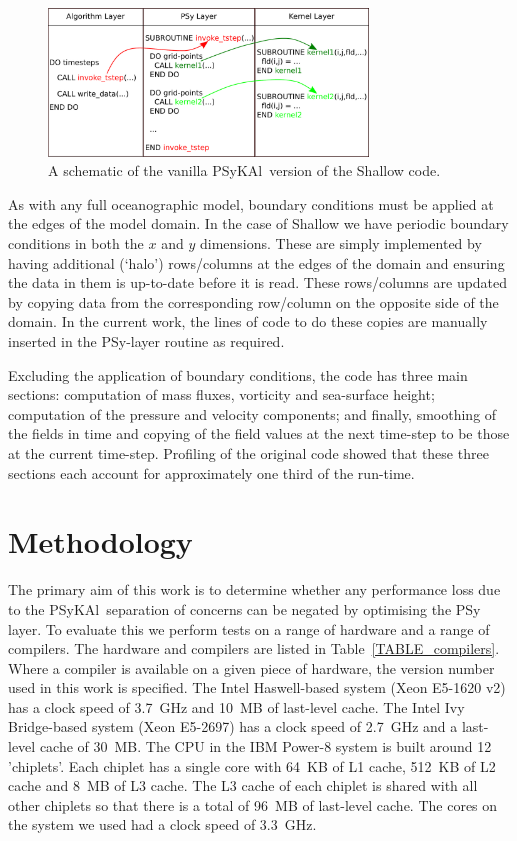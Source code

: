 \documentclass{IOS-Book-Article}
\newcommand{\psykal}{{PS}y{KA}l\ }
\begin{document}
\begin{figure}
\centering
\includegraphics[width=85mm]{psykal_shallow}
\caption{A schematic of the vanilla \psykal version of the Shallow code.}
\label{FIG_psykal_shallow_structure}
\end{figure}

As with any full oceanographic model, boundary conditions must be
applied at the edges of the model domain. In the case of Shallow we
have periodic boundary conditions in both the $x$ and $y$ dimensions.
These are simply implemented by having additional (`halo')
rows/columns at the edges of the domain and ensuring the data in them
is up-to-date before it is read. These rows/columns are updated by
copying data from the corresponding row/column on the opposite side of
the domain. In the current work, the lines of code to do these copies
are manually inserted in the PSy-layer routine as required.

Excluding the application of boundary conditions, the code has three
main sections: computation of mass fluxes, vorticity and sea-surface
height; computation of the pressure and velocity components; and
finally, smoothing of the fields in time and copying of the field
values at the next time-step to be those at the current
time-step. Profiling of the original code showed that these three
sections each account for approximately one third of the run-time.

\section{Methodology}

The primary aim of this work is to determine whether any performance
loss due to the \psykal separation of concerns can be negated by
optimising the PSy layer. To evaluate this we perform tests on a range
of hardware and a range of compilers. The hardware and compilers are
listed in Table~\ref{TABLE_compilers}. Where a compiler is available
on a given piece of hardware, the version number used in this work is
specified.
%
The Intel Haswell-based system (Xeon E5-1620 v2) has a clock speed of
3.7~GHz and 10~MB of last-level cache. The Intel Ivy Bridge-based
system (Xeon E5-2697) has a clock speed of 2.7~GHz and a last-level
cache of 30~MB. The CPU in the IBM Power-8 system is built around 12
'chiplets'. Each chiplet has a single core with 64~KB of L1 cache,
512~KB of L2 cache and 8~MB of L3 cache. The L3 cache of each chiplet
is shared with all other chiplets so that there is a total of 96~MB of
last-level cache. The cores on the system we used had a clock speed of
3.3~GHz.
\end{document}

